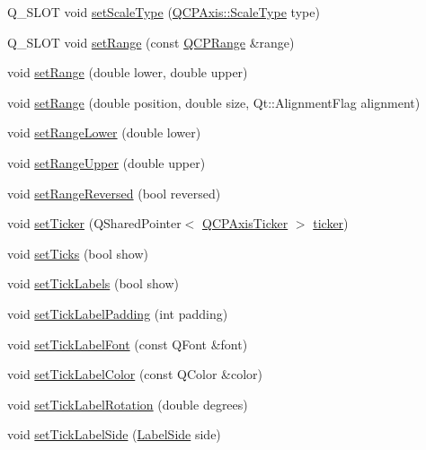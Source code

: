 \begin{DoxyCompactItemize}
Q\+\_\+\+S\+L\+OT void \hyperlink{class_q_c_p_axis_adef29cae617af4f519f6c40d1a866ca6}{set\+Scale\+Type} (\hyperlink{class_q_c_p_axis_a36d8e8658dbaa179bf2aeb973db2d6f0}{Q\+C\+P\+Axis\+::\+Scale\+Type} type)
\item 
Q\+\_\+\+S\+L\+OT void \hyperlink{class_q_c_p_axis_aebdfea5d44c3a0ad2b4700cd4d25b641}{set\+Range} (const \hyperlink{class_q_c_p_range}{Q\+C\+P\+Range} \&range)
\item 
void \hyperlink{class_q_c_p_axis_a57d6ee9e9009fe88cb19db476ec70bca}{set\+Range} (double lower, double upper)
\item 
void \hyperlink{class_q_c_p_axis_acf60e5b2d631fbc8c4548c3d579cb6d0}{set\+Range} (double position, double size, Qt\+::\+Alignment\+Flag alignment)
\item 
void \hyperlink{class_q_c_p_axis_afcf51227d337db28d1a9ce9a4d1bc91a}{set\+Range\+Lower} (double lower)
\item 
void \hyperlink{class_q_c_p_axis_acd3ca1247aa867b540cd5ec30ccd3bef}{set\+Range\+Upper} (double upper)
\item 
void \hyperlink{class_q_c_p_axis_a2172fdb196b1a0dc3f40992fcad8e9e1}{set\+Range\+Reversed} (bool reversed)
\item 
void \hyperlink{class_q_c_p_axis_a4ee03fcd2c74d05cd1a419b9af5cfbdc}{set\+Ticker} (Q\+Shared\+Pointer$<$ \hyperlink{class_q_c_p_axis_ticker}{Q\+C\+P\+Axis\+Ticker} $>$ \hyperlink{class_q_c_p_axis_a7b7a27151be8235059e1294f73ecf615}{ticker})
\item 
void \hyperlink{class_q_c_p_axis_ac891409315bc379e3b1abdb162c1a011}{set\+Ticks} (bool show)
\item 
void \hyperlink{class_q_c_p_axis_a04ba16e1f6f78d70f938519576ed32c8}{set\+Tick\+Labels} (bool show)
\item 
void \hyperlink{class_q_c_p_axis_af302c479af9dbc2e9f0e44e07c0012ee}{set\+Tick\+Label\+Padding} (int padding)
\item 
void \hyperlink{class_q_c_p_axis_a2b8690c4e8dbc39d9185d2b398ce7a6c}{set\+Tick\+Label\+Font} (const Q\+Font \&font)
\item 
void \hyperlink{class_q_c_p_axis_a395e445c3fe496b935bee7b911ecfd1c}{set\+Tick\+Label\+Color} (const Q\+Color \&color)
\item 
void \hyperlink{class_q_c_p_axis_a1bddd4413df8a576b7ad4b067fb33375}{set\+Tick\+Label\+Rotation} (double degrees)
\item 
void \hyperlink{class_q_c_p_axis_a13ec644fc6e22715744c92c6dfa4f0fa}{set\+Tick\+Label\+Side} (\hyperlink{class_q_c_p_axis_a24b13374b9b8f75f47eed2ea78c37db9}{Label\+Side} side)

\end{DoxyCompactItemize}
